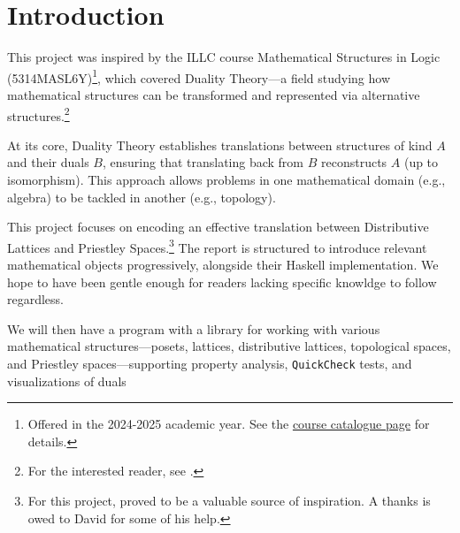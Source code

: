 \section{Introduction}
\label{sec:introduction}
This project was inspired by the ILLC course Mathematical Structures in Logic (5314MASL6Y)\footnote{Offered in the 2024-2025 academic year. See the \href{https://studiegids.uva.nl/xmlpages/page/2024-2025-en/search-course/course/118785}{course catalogue page} for details.}, which covered Duality Theory—a field studying how mathematical structures can be transformed and represented via alternative structures.\footnote{For the interested reader, see \cite{burrisCourseUniversalAlgebra2012, daveyIntroductionLatticesOrder2010, johnstoneStoneSpaces1992, kelleyGeneralTopology2007, munkresTopology2000}.}

At its core, Duality Theory establishes translations between structures of kind $A$ and their duals $B$, ensuring that translating back from $B$ reconstructs $A$ (up to isomorphism). This approach allows problems in one mathematical domain (e.g., algebra) to be tackled in another (e.g., topology).

This project focuses on encoding an effective translation between Distributive Lattices and Priestley Spaces.\footnote{For this project, \cite{quinnalvarezTopomodels2025} proved to be a valuable source of inspiration. A thanks is owed to David for some of his help.} The report is structured to introduce relevant mathematical objects progressively, alongside their Haskell implementation. We hope to have been gentle enough for readers lacking specific knowldge to follow regardless.

We will then have a program with a library for working with various mathematical structures—posets, lattices, distributive lattices, topological spaces, and Priestley spaces—supporting property analysis, \texttt{QuickCheck} tests, and visualizations of duals







